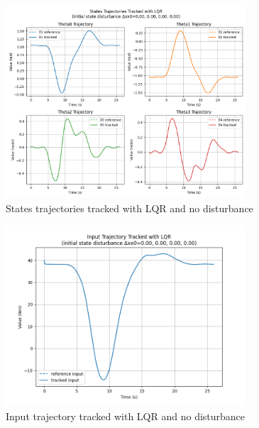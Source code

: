\documentclass[a4paper,11pt,oneside]{book}
\begin{document}
\begin{figure}[H]
    \centering
    \includegraphics[width=0.8\textwidth]{States_Trajectories_Tracked_with_LQR_T3.png}
    \caption{States trajectories tracked with LQR and no disturbance}
    \label{fig:enter-label}
\end{figure}
\begin{figure}[H]
    \centering
    \includegraphics[width=0.8\textwidth]{Input_Trajectory_Tracked_with_LQR_T3.png}
    \caption{Input trajectory tracked with LQR and no disturbance}
    \label{fig:enter-label}
\end{figure}
\end{document}
